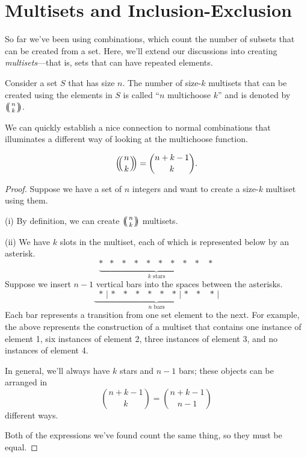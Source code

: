 \documentclass[../m055main.tex]{subfiles}
\begin{document}
\section{Multisets and Inclusion-Exclusion}
So far we've been using combinations, which count the number of subsets that can be created from a set.
Here, we'll extend our discussions into creating \textit{multisets}---that is, sets that can have repeated elements.

\begin{definition}[Multichoose]
    Consider a set $S$ that has size $n$.
    The number of size-$k$ multisets that can be created using the elements in $S$ is called ``$n$ multichoose $k$'' and is denoted by $\mchoose{n}{k}$.
\end{definition}

We can quickly establish a nice connection to normal combinations that illuminates a different way of looking at the multichoose function.

\begin{theorem}
    \[ \mchoose{n}{k} = {n+k-1 \choose k}. \]
\end{theorem}

\begin{proof}
    Suppose we have a set of $n$ integers and want to create a size-$k$ multiset using them.
    \smallskip

    (i) By definition, we can create $\mchoose{n}{k}$ multisets.
    \smallskip

    (ii) We have $k$ slots in the multiset, each of which is represented below by an asterisk.
    \[ \underbrace{* \,\phantom{|}\, * \,\phantom{|}\, * \,\phantom{|}\, * \,\phantom{|}\, * \,\phantom{|}\, * \,\phantom{|}\, * \,\phantom{|}\, * \,\phantom{|}\, * \,\phantom{|}\,\, *}_{k \text{ stars}} \]
    Suppose we insert $n-1$ vertical bars into the spaces between the asterisks.
    \[ \underbrace{\phantom{|}\,* \,|\, * \,\phantom{|}\, * \,\phantom{|}\, * \,\phantom{|}\, * \,\phantom{|}\, * \,\phantom{|}\, * \,|\, * \,\phantom{|}\, * \,\phantom{|}\,\, *\,|}_{n \text{ bars}} \]
    Each bar represents a transition from one set element to the next.
    For example, the above represents the construction of a multiset that contains one instance of element 1, six instances of element 2, three instances of element 3, and no instances of element 4.

    In general, we'll always have $k$ stars and $n-1$ bars; these objects can be arranged in
    \[ {n+k-1 \choose k} = {n+k-1 \choose n-1} \]
    different ways.
    \smallskip

    Both of the expressions we've found count the same thing, so they must be equal.
\end{proof}
\end{document}
